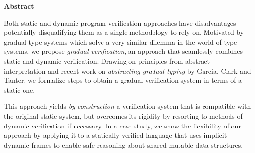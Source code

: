\begin{center}
\begin{minipage}{0.7\textwidth}
\vspace*{15\baselineskip}
\begin{center}
\textbf{Abstract}
\end{center}
Both static and dynamic program verification approaches have disadvantages potentially disqualifying them as a single methodology to rely on.
Motivated by gradual type systems which solve a very similar dilemma in the world of type systems, we propose \textit{gradual verification}, an approach that seamlessly combines static and dynamic verification.
Drawing on principles from abstract interpretation and recent work on \textit{abstracting gradual typing} by Garcia, Clark and Tanter, we formalize steps to obtain a gradual verification system in terms of a static one.

This approach yields \textit{by construction} a verification system that is compatible with the original static system, but overcomes its rigidity by resorting to methods of dynamic verification if necessary.
In a case study, we show the flexibility of our approach by applying it to a statically verified language that uses implicit dynamic frames to enable safe reasoning about shared mutable data structures.
\end{minipage}
\end{center}
